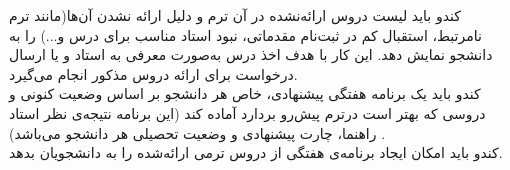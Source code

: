 \documentclass{report}
\begin{document}
                                                                                                                                                                                                                                                                                                                                                                                                                                                                                                                                                                                                                                                                                                                                                                                                                                                                                              کندو باید لیست دروس ارائه‌نشده در آن ترم و دلیل ارائه نشدن آن‌ها(مانند ترم نامرتبط، استقبال کم در ثبت‌نام مقدماتی، نبود استاد مناسب برای درس و...) را به دانشجو نمایش دهد. این کار با هدف اخذ درس به‌صورت معرفی به استاد و یا ارسال درخواست برای ارائه دروس مذکور انجام می‌گیرد.
\\                                                                                                                                                                                                                         کندو باید یک برنامه هفتگی پیشنهادی، خاص هر دانشجو بر اساس وضعیت کنونی و دروسی که بهتر است درترم پیش‌رو بردارد آماده کند
(این برنامه نتیجه‌ی نظر استاد راهنما، چارت پیشنهادی و وضعیت تحصیلی هر دانشجو می‌باشد)                                                                                                                                                                                                                                                                                                                                                                                                                                               . 
 \\                                                                                                                                                                                                                          کندو باید امکان ایجاد برنامه‌ی هفتگی از دروس ترمی ارائه‌شده را به دانشجویان بدهد.
\end{document}
